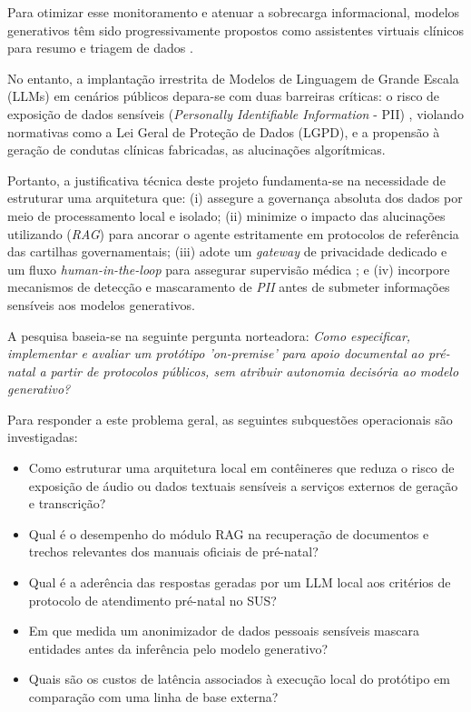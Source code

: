 \documentclass[12pt]{article}
\begin{document}
Para otimizar esse monitoramento e atenuar a sobrecarga informacional, modelos generativos têm sido progressivamente propostos como assistentes virtuais clínicos para resumo e triagem de dados \cite{Clusmann2023, Rajpurkar2022}.

No entanto, a implantação irrestrita de Modelos de Linguagem de Grande Escala (LLMs) em cenários públicos depara-se com duas barreiras críticas: o risco de exposição de dados sensíveis (\textit{Personally Identifiable Information} - PII) \cite{OWASPLLM2023, Atheniense2024}, violando normativas como a Lei Geral de Proteção de Dados (LGPD), e a propensão à geração de condutas clínicas fabricadas, as alucinações algorítmicas.

Portanto, a justificativa técnica deste projeto fundamenta-se na necessidade de estruturar uma arquitetura que:
(i) assegure a governança absoluta dos dados por meio de processamento local e isolado;
(ii) minimize o impacto das alucinações utilizando (\textit{RAG}) para ancorar o agente estritamente em protocolos de referência das cartilhas governamentais;
(iii) adote um \textit{gateway} de privacidade dedicado e um fluxo \textit{human-in-the-loop} para assegurar supervisão médica \cite{FrameworkGovBR2025};
e (iv) incorpore mecanismos de detecção e mascaramento de \textit{PII} antes de submeter informações sensíveis aos modelos generativos.


A pesquisa baseia-se na seguinte pergunta norteadora: \textit{Como especificar, implementar e avaliar um protótipo 'on-premise' para apoio documental ao pré-natal a partir de protocolos públicos, sem atribuir autonomia decisória ao modelo generativo?}

Para responder a este problema geral, as seguintes subquestões operacionais são investigadas:
\begin{itemize}
  	\item Como estruturar uma arquitetura local em contêineres que reduza o risco de exposição de áudio ou dados textuais sensíveis a serviços externos de geração e transcrição?
  	\item Qual é o desempenho do módulo RAG na recuperação de documentos e trechos relevantes dos manuais oficiais de pré-natal?
	\item Qual é a aderência das respostas geradas por um LLM local aos critérios de protocolo de atendimento pré-natal no SUS?
	\item Em que medida um anonimizador de dados pessoais sensíveis mascara entidades antes da inferência pelo modelo generativo?
	\item Quais são os custos de latência associados à execução local do protótipo em comparação com uma linha de base externa?
\end{itemize}
\end{document}
